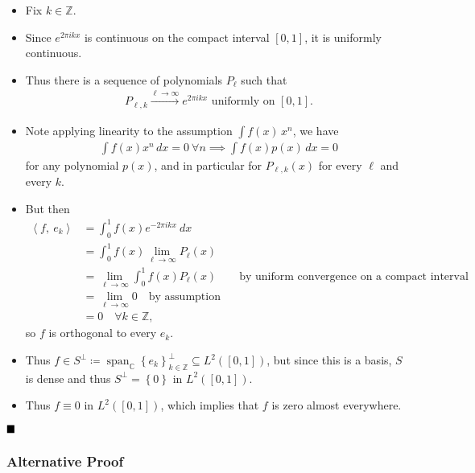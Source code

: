 \begin{solution}
\begin{itemize}
\item
  Fix \(k \in {\mathbb{Z}}\).
\item
  Since \(e^{2\pi i k x}\) is continuous on the compact interval
  \([0, 1]\), it is uniformly continuous.
\item
  Thus there is a sequence of polynomials \(P_\ell\) such that
  \begin{align*}
  P_{\ell, k} \overset{\ell\to\infty}\to e^{2\pi i k x} \text{ uniformly on } [0,1]
  .\end{align*}
\item
  Note applying linearity to the assumption \(\int f(x) \, x^n\), we
  have
  \begin{align*}
  \int f(x) x^n \,dx = 0 ~\forall n \implies \int f(x) p(x) \,dx = 0 
  \end{align*}
  for any polynomial \(p(x)\), and in particular for \(P_{\ell, k}(x)\)
  for every \(\ell\) and every \(k\).
\item
  But then\\
  \begin{align*}
  {\left\langle {f},~{e_k} \right\rangle} 
  &= \int_0^1 f(x) e^{-2\pi i k x} ~dx \\
  &= \int_0^1 f(x) \lim_{\ell \to \infty} P_\ell(x) \\
  &= \lim_{\ell \to \infty}  \int_0^1 f(x) P_\ell(x) \quad\quad \text{by uniform convergence on a compact interval} \\
  &= \lim_{\ell \to \infty} 0 \quad\text{by assumption}\\
  &= 0 \quad \forall k\in {\mathbb{Z}}
  ,\end{align*}
  so \(f\) is orthogonal to every \(e_k\).
\item
  Thus
  \(f\in S^\perp \coloneqq{\operatorname{span}}_{\mathbb{C}}\left\{{e_k}\right\}_{k\in {\mathbb{Z}}}^\perp \subseteq L^2([0, 1])\),
  but since this is a basis, \(S\) is dense and thus
  \(S^\perp = \left\{{0}\right\}\) in \(L^2([0, 1])\).
\item
  Thus \(f\equiv 0\) in \(L^2([0, 1])\), which implies that \(f\) is
  zero almost everywhere.
\end{itemize}

\(\hfill\blacksquare\)

\hypertarget{alternative-proof}{%
\subsubsection{Alternative Proof}\label{alternative-proof}}


\end{solution}
